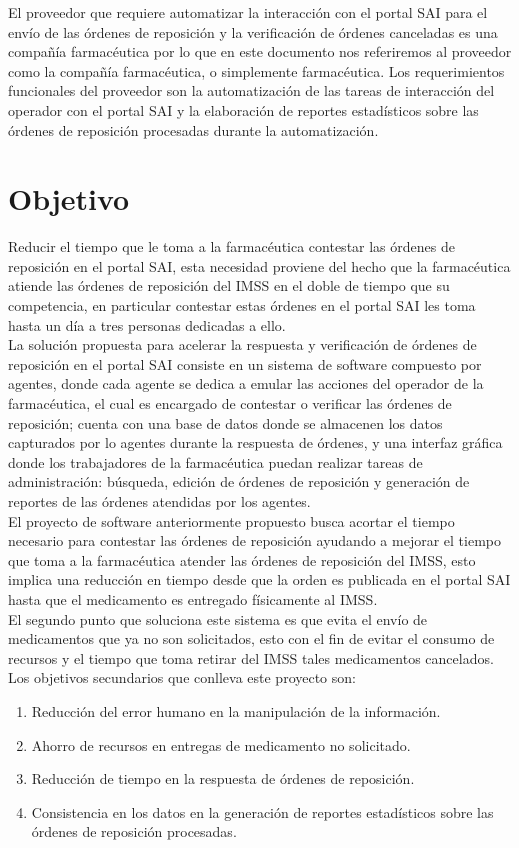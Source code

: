 El proveedor que requiere automatizar la interacción con el portal SAI para el envío de las órdenes de reposición y la verificación de órdenes canceladas es una compañía farmacéutica por lo que en este documento nos referiremos al proveedor como la compañía farmacéutica, o simplemente farmacéutica. Los requerimientos funcionales del proveedor son la automatización de las tareas de interacción del operador con el portal SAI y la elaboración de reportes estadísticos sobre las órdenes de reposición procesadas durante la automatización.


\section{Objetivo}
Reducir el tiempo que le toma a la farmacéutica contestar las órdenes de reposición en el portal SAI, esta necesidad proviene del hecho que la farmacéutica atiende las órdenes de reposición del IMSS en el doble de tiempo que su competencia, en particular contestar estas órdenes en el portal SAI les toma hasta un día a tres personas dedicadas a ello.\\
La solución propuesta para acelerar la respuesta y verificación de órdenes de reposición en el portal SAI consiste en un sistema de software compuesto por agentes, donde cada agente se dedica a emular las acciones del operador de la farmacéutica, el cual es encargado de contestar o verificar las órdenes de reposición; cuenta con una base de datos donde se almacenen los datos capturados por lo agentes durante la respuesta de órdenes, y una interfaz gráfica donde los trabajadores de la farmacéutica puedan realizar tareas de administración: búsqueda, edición de órdenes de reposición y  generación de reportes de las órdenes atendidas por los agentes.\\
El proyecto de software anteriormente propuesto busca acortar el tiempo necesario para contestar las órdenes de reposición ayudando a mejorar el tiempo que toma a la farmacéutica atender las órdenes de reposición del IMSS, esto implica una reducción en tiempo desde que la orden es publicada en el portal SAI hasta que el medicamento es entregado físicamente al IMSS.\\
El segundo punto que soluciona este sistema es que evita el envío de medicamentos que ya no son solicitados, esto con el fin de evitar el consumo de recursos y el tiempo que toma retirar del IMSS tales medicamentos cancelados.\\
Los objetivos secundarios que conlleva este proyecto son:
\begin{enumerate}
\item Reducción del error humano en la manipulación de la información. 
\item Ahorro de recursos en entregas de medicamento no solicitado. 
\item Reducción de tiempo en la respuesta de órdenes de reposición.
\item Consistencia en los datos en la generación de reportes estadísticos sobre las órdenes de reposición procesadas.
\end{enumerate}
